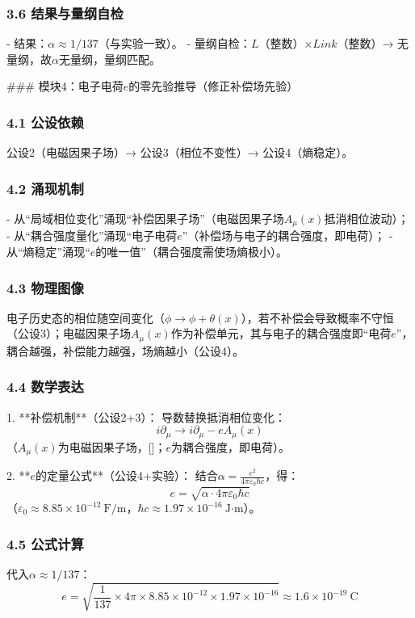 \documentclass{article}
\begin{document}
\subsubsection{3.6 结果与量纲自检}
- 结果：\(\alpha≈1/137\)（与实验一致）。  
- 量纲自检：\(L\)（整数）×\(Link\)（整数）→ 无量纲，故\(\alpha\)无量纲，量纲匹配。


### 模块4：电子电荷\(e\)的零先验推导（修正补偿场先验）
\subsubsection{4.1 公设依赖}
公设2（电磁因果子场）→ 公设3（相位不变性）→ 公设4（熵稳定）。

\subsubsection{4.2 涌现机制}
- 从“局域相位变化”涌现“补偿因果子场”（电磁因果子场\(A_\mu(x)\)抵消相位波动）；  
- 从“耦合强度量化”涌现“电子电荷\(e\)”（补偿场与电子的耦合强度，即电荷）；  
- 从“熵稳定”涌现“\(e\)的唯一值”（耦合强度需使场熵极小）。

\subsubsection{4.3 物理图像}
电子历史态的相位随空间变化（\(\phi \to \phi+\theta(x)\)），若不补偿会导致概率不守恒（公设3）；电磁因果子场\(A_\mu(x)\)作为补偿单元，其与电子的耦合强度即“电荷\(e\)”，耦合越强，补偿能力越强，场熵越小（公设4）。

\subsubsection{4.4 数学表达}
1. **补偿机制**（公设2+3）：  
   导数替换抵消相位变化：  
   \[
   i\partial_\mu \to i\partial_\mu - e A_\mu(x)
   \]  
   （\(A_\mu(x)\)为电磁因果子场，[]；\(e\)为耦合强度，即电荷）。

2. **\(e\)的定量公式**（公设4+实验）：  
   结合\(\alpha = \frac{e^2}{4\pi\varepsilon_0\hbar c}\)，得：  
   \[
   e = \sqrt{\alpha \cdot 4\pi\varepsilon_0\hbar c}
   \]  
   （\(\varepsilon_0≈8.85×10^{-12}\ \text{F/m}\)，\(\hbar c≈1.97×10^{-16}\ \text{J·m}\)）。

\subsubsection{4.5 公式计算}
代入\(\alpha≈1/137\)：  
\[
e = \sqrt{\frac{1}{137} \times 4\pi \times 8.85×10^{-12} \times 1.97×10^{-16}} ≈ 1.6×10^{-19}\ \text{C}
\]
\end{document}
